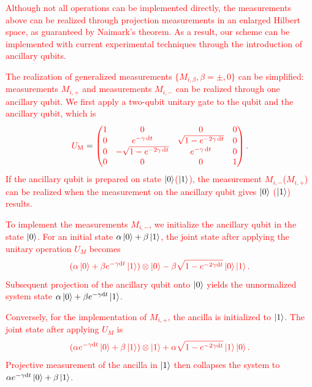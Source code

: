 \documentclass[longbibliography, aps, prx, amsmath, amssymb, amsfonts, twocolumn,superscriptaddress, footinbib]{revtex4-1}
\newcommand{\dif}{\mathop{}\!\mathrm{d}}
\begin{document}
	\textcolor{red}{Although not all operations can be implemented directly, the measurements above can be realized through projection measurements in an enlarged Hilbert space, as guaranteed by Naimark's theorem. As a result, our scheme can be implemented with current experimental techniques through the introduction of ancillary qubits.}
	
	\textcolor{red}{The realization of generalized measurements $\{M_{i,\beta}, \beta=\pm,0\}$ can be simplified: measurements $M_{i,+}$ and measurements $M_{i,-}$ can be realized through one ancillary qubit. We first apply a two-qubit unitary gate to the qubit and the ancillary qubit, which is}
	\begin{equation}
		{\color{red} U_{\text{M}}} = {\color{red} \begin{pmatrix}
		  1 & 0 & 0 & 0\\
		  0 & e^{-\gamma \dif t} & \sqrt{1-e^{-2 \gamma \dif t}} & 0\\
		  0 & -\sqrt{1-e^{-2 \gamma \dif t}} & e^{-\gamma \dif t} & 0\\
		  0 & 0 & 0 & 1
		\end{pmatrix}.}
	\end{equation}
	\textcolor{red}{If the ancillary qubit is prepared on state $\ket{0}$($\ket{1}$), the measurement $M_{i,-}$($M_{i,+}$) can be realized when the measurement on the ancillary qubit gives $\ket{0}$ ($\ket{1}$) results.}

	\textcolor{red}{To implement the measurements $M_{i,-}$, we initialize the ancillary qubit in the state $\ket{0}$. For an initial state $\alpha \ket{0} + \beta \ket{1}$, the joint state after applying the unitary operation $U_M$ becomes}
	\begin{equation}
		\textcolor{red}{(\alpha \ket{0} + \beta e^{-\gamma \mathrm{d}t} \ket{1}) \otimes \ket{0} - \beta \sqrt{1-e^{-2\gamma\mathrm{d}t}} \ket{0} \ket{1}.}
	\end{equation}
	\textcolor{red}{Subsequent projection of the ancillary qubit onto $\ket{0}$ yields the unnormalized system state $\alpha \ket{0} + \beta e^{-\gamma \mathrm{d}t} \ket{1}$.}
	
	\textcolor{red}{Conversely, for the implementation of $M_{i,+}$, the ancilla is initialized to $\ket{1}$. The joint state after applying $U_M$ is}
	\begin{equation}
		\textcolor{red}{(\alpha e^{-\gamma \mathrm{d}t} \ket{0} + \beta  \ket{1}) \otimes \ket{1} + \alpha \sqrt{1-e^{-2\gamma\mathrm{d}t}} \ket{1} \ket{0}.}
	\end{equation}
	\textcolor{red}{Projective measurement of the ancilla in $\ket{1}$ then collapses the system to $\alpha e^{-\gamma \mathrm{d}t} \ket{0} + \beta  \ket{1}$.}
	
\end{document}
